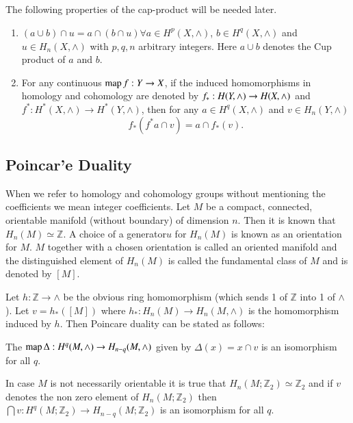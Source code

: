 \subsection{}\label{chap1:subsec1.2}%
The following properties of the cap-product will be needed later.
\begin{enumerate}
\renewcommand{\labelenumi}{\bf(\theenumi)}
\item $(a  \cup b) \cap u=a \cap (b \cap u) \forall a \in H^p
  (X, \wedge)$, $b \in H^q (X, \wedge)$ and $u \in H_n (X,
  \wedge)$ with $p, q, n$ arbitrary integers. Here $a \cup b$
  denotes the Cup product of $a$ and $b$. 

\item For any continuous $\operatorname{map} f: Y\to X$, if the induced homomorphisms
  in homology and cohomology are denoted by $f_* : H (Y,\break \wedge) \to
  H(X, \wedge)$ and $f^* : H^* (X, \wedge) \to H^* (Y, \wedge)$, then
  for any $a \in H^q (X, \wedge)$ and $v \in H_n (Y,
  \wedge)$ 
$$
f_* (f^* a \cap v) = a \cap f_* (v). 
$$
\end{enumerate}


\subsection{Poincar'e Duality}\label{chap1:subsec1.3}%

When we refer to homology and cohomology groups without mentioning the
coefficients we mean integer coefficients. Let $M$ be a compact,
connected, orientable manifold (without boundary) of dimension
$n$. Then it is known that $H_n (M) \simeq \mathbb{Z}$. A choice of a
generator\pageoriginale $u$ for $H_n (M)$ is known as an orientation
for $M$. $M$ 
together with a chosen orientation is called an oriented manifold and
the distinguished element of $H_n (M)$ is called the fundamental class
of $M$ and is denoted by $[M]$. 

Let $h : \mathbb{Z} \to \wedge$ be the obvious ring homomorphism
(which sends 1 of $\mathbb{Z}$ into 1 of $\wedge$). Let $v = h_*
([M])$ where $h_* : H_n (M) \to H_n (M, \wedge)$ is the homomorphism
induced by $h$. Then Poincare duality can be stated as follows: 

The $\operatorname{map} \Delta : H^q (M, \wedge) \to H_{n-q} (M, \wedge)$ given by
$\Delta (x) = x \cap v$ is an isomorphism for all $q$. 

In case $M$ is not necessarily orientable it is true that $H_n
(M;\mathbb{Z}_2) \simeq \mathbb{Z}_2 $ and if $v$ denotes the non zero
element of $H_n (M; \mathbb{Z}_2)$ then $\bigcap v : H^q (M;
\mathbb{Z}_2) \to H_{n-q} (M; \mathbb{Z}_2)$ is an isomorphism for all
$q$. 

